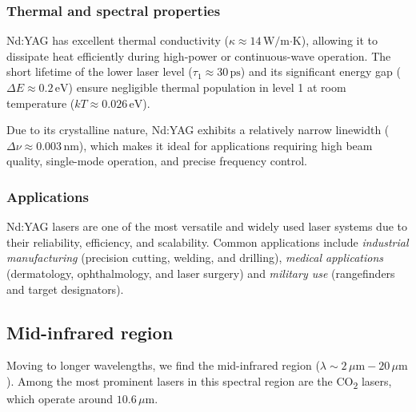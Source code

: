 \documentclass[prl,twocolumn]{revtex4-1}
\begin{document}
\subsubsection{\textbf{Thermal and spectral properties}}
Nd:YAG has excellent thermal conductivity (\( \kappa \approx 14 \, \text{W/m·K} \)), allowing it to dissipate heat efficiently during high-power or continuous-wave operation. The short lifetime of the lower laser level (\( \tau_1 \approx 30 \, \text{ps} \)) and its significant energy gap (\( \Delta E \approx 0.2 \, \text{eV} \)) ensure negligible thermal population in level 1 at room temperature (\( kT \approx 0.026 \, \text{eV} \)).

Due to its crystalline nature, Nd:YAG exhibits a relatively narrow linewidth (\( \Delta\nu \approx 0.003 \, \text{nm} \)), which makes it ideal for applications requiring high beam quality, single-mode operation, and precise frequency control.

\subsubsection{\textbf{Applications}}
Nd:YAG lasers are one of the most versatile and widely used laser systems due to their reliability, efficiency, and scalability. Common applications include \textit{industrial manufacturing} (precision cutting, welding, and drilling), \textit{medical applications} (dermatology, ophthalmology, and laser surgery) and \textit{military use} (rangefinders and target designators).



\subsection{\textbf{Mid-infrared region}}
Moving to longer wavelengths, we find the mid-infrared region (\( \lambda \sim 2 \, \mu\text{m} - 20 \, \mu\text{m} \)). Among the most prominent lasers in this spectral region are the CO\textsubscript{2} lasers, which operate around \( 10.6 \, \mu\text{m} \).
\end{document}
